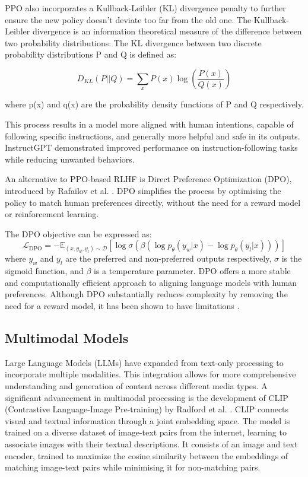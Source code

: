 \documentclass[a4paper, oneside]{discothesis}
\begin{document}
PPO also incorporates a Kullback-Leibler (KL) divergence penalty to further ensure the new policy doesn't deviate too far from the old one. The Kullback-Leibler divergence is an information theoretical measure of the difference between two probability distributions. The KL divergence between two discrete probability distributions P and Q is defined as:

\[D_{KL}(P||Q) = \sum_{x} P(x) \log\left(\frac{P(x)}{Q(x)}\right)\]

where p(x) and q(x) are the probability density functions of P and Q respectively.

This process results in a model more aligned with human intentions, capable of following specific instructions, and generally more helpful and safe in its outputs. InstructGPT demonstrated improved performance on instruction-following tasks while reducing unwanted behaviors.

An alternative to PPO-based RLHF is Direct Preference Optimization (DPO), introduced by Rafailov et al. \cite{rafailov2023direct}. 
DPO simplifies the process by optimising the policy to match human preferences directly, without the need for a reward model or reinforcement learning. 

The DPO objective can be expressed as:
\[\mathcal{L}_{\text{DPO}} = -\mathbb{E}_{(x,y_w,y_l)\sim \mathcal{D}}[\log \sigma(\beta(\log p_\theta(y_w|x) - \log p_\theta(y_l|x)))]\]
where $y_w$ and $y_l$ are the preferred and non-preferred outputs respectively, $\sigma$ is the sigmoid function, and $\beta$ is a temperature parameter. DPO offers a more stable and computationally efficient approach to aligning language models with human preferences. Although DPO substantially reduces complexity by removing the need for a reward model, it has been shown to have limitations \cite{xu2024dposuperiorppollm}.


\subsection{Multimodal Models}
Large Language Models (LLMs) have expanded from text-only processing to incorporate multiple modalities. This integration allows for more comprehensive understanding and generation of content across different media types. A significant advancement in multimodal processing is the development of CLIP (Contrastive Language-Image Pre-training) by Radford et al. \cite{radford2021cliplearning}. CLIP connects visual and textual information through a joint embedding space. The model is trained on a diverse dataset of image-text pairs from the internet, learning to associate images with their textual descriptions. It consists of an image and text encoder, trained to maximize the cosine similarity between the embeddings of matching image-text pairs while minimising it for non-matching pairs.
\end{document}
